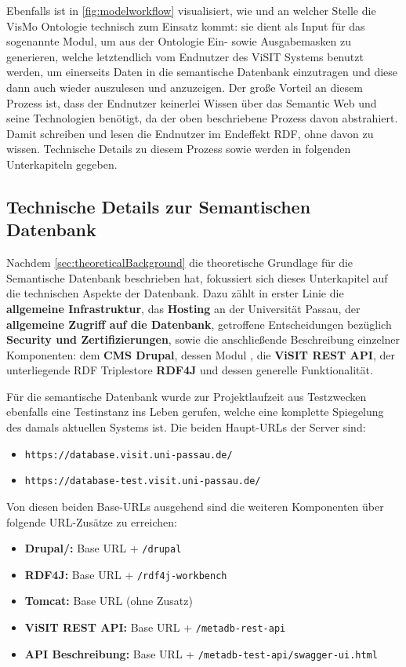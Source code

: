 Ebenfalls ist in \autoref{fig:modelworkflow} visualisiert, wie und an welcher Stelle die VisMo Ontologie technisch zum Einsatz kommt: sie dient als Input für das sogenannte \wisski Modul, um aus der Ontologie Ein- sowie Ausgabemasken zu generieren, welche letztendlich vom Endnutzer des ViSIT Systems benutzt werden, um einerseits Daten in die semantische Datenbank einzutragen und diese dann auch wieder auszulesen und anzuzeigen. Der große Vorteil an diesem Prozess ist, dass der Endnutzer keinerlei Wissen über das Semantic Web und seine Technologien benötigt, da der oben beschriebene Prozess davon abstrahiert. Damit schreiben und lesen die Endnutzer im Endeffekt RDF, ohne davon zu wissen. Technische Details zu diesem Prozess sowie \wisski werden in folgenden Unterkapiteln gegeben.

\subsection{Technische Details zur Semantischen Datenbank}\label{sec:technicalBackground}

Nachdem \autoref{sec:theoreticalBackground} die theoretische Grundlage für die Semantische Datenbank beschrieben hat, fokussiert sich dieses Unterkapitel auf die technischen Aspekte der Datenbank. Dazu zählt in erster Linie die \textbf{allgemeine Infrastruktur}, das \textbf{Hosting} an der Universität Passau, der \textbf{allgemeine Zugriff auf die Datenbank}, getroffene Entscheidungen bezüglich \textbf{Security und Zertifizierungen}, sowie die anschließende Beschreibung einzelner Komponenten: dem \textbf{CMS Drupal}, dessen Modul \textbf{\wisski}, die \textbf{ViSIT REST API}, der unterliegende RDF Triplestore \textbf{RDF4J} und dessen generelle Funktionalität.

Für die semantische Datenbank wurde zur Projektlaufzeit aus Testzwecken ebenfalls eine Testinstanz ins Leben gerufen, welche eine komplette Spiegelung des damals aktuellen Systems ist. Die beiden Haupt-URLs der Server sind:

\begin{itemize}
	\item \texttt{https://database.visit.uni-passau.de/}
	\item \texttt{https://database-test.visit.uni-passau.de/}
\end{itemize}

Von diesen beiden Base-URLs ausgehend sind die weiteren Komponenten über folgende URL-Zusätze zu erreichen:

\begin{itemize}
	\item \textbf{Drupal/\wisski:} Base URL + \texttt{/drupal}
	\item \textbf{RDF4J:} Base URL + \texttt{/rdf4j-workbench}
	\item \textbf{Tomcat:} Base URL (ohne Zusatz)
	\item \textbf{ViSIT REST API:} Base URL + \texttt{/metadb-rest-api}
	\item \textbf{API Beschreibung:} Base URL + \texttt{/metadb-test-api/swagger-ui.html}
\end{itemize}

